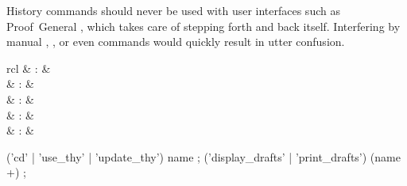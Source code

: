 \begin{isabellebody}
\begin{isamarkuptext}
  \begin{warn}
    History commands should never be used with user interfaces such as
    Proof~General \cite{proofgeneral,Aspinall:TACAS:2000}, which takes
    care of stepping forth and back itself.  Interfering by manual
    \hyperlink{command.undo}{\mbox{}}, \hyperlink{command.redo}{\mbox{}}, or even \hyperlink{command.kill}{\mbox{}}
    commands would quickly result in utter confusion.
  \end{warn}%
\end{isamarkuptext}%
\isamarkuptrue%
%
\isamarkuptrue%
%
\begin{isamarkuptext}%
\begin{matharray}{rcl}
    \hypertarget{command.cd}{\hyperlink{command.cd}{\mbox{}}}\isa{{\isachardoublequote}\isactrlsup {\isacharasterisk}{\isachardoublequote}} & : & \isarkeep{\cdot} \\
    \hypertarget{command.pwd}{\hyperlink{command.pwd}{\mbox{}}}\isa{{\isachardoublequote}\isactrlsup {\isacharasterisk}{\isachardoublequote}} & : & \isarkeep{\cdot} \\
    \hypertarget{command.use-thy}{\hyperlink{command.use-thy}{\mbox{}}}\isa{{\isachardoublequote}\isactrlsup {\isacharasterisk}{\isachardoublequote}} & : & \isarkeep{\cdot} \\
    \hypertarget{command.display-drafts}{\hyperlink{command.display-drafts}{\mbox{}}}\isa{{\isachardoublequote}\isactrlsup {\isacharasterisk}{\isachardoublequote}} & : & \isarkeep{\cdot} \\
    \hypertarget{command.print-drafts}{\hyperlink{command.print-drafts}{\mbox{}}}\isa{{\isachardoublequote}\isactrlsup {\isacharasterisk}{\isachardoublequote}} & : & \isarkeep{\cdot} \\
  \end{matharray}

  \begin{rail}
    ('cd' | 'use\_thy' | 'update\_thy') name
    ;
    ('display\_drafts' | 'print\_drafts') (name +)
    ;
  \end{rail}


\end{isamarkuptext}
\end{isabellebody}
